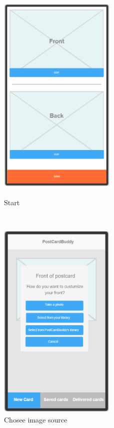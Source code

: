 \documentclass[10pt,a4paper]{article}
\begin{document}
\begin {description}
\begin{figure}[p]
\centering
	\begin{minipage}{0.5\textwidth}
	\centering
		\includegraphics[width=0.5\textwidth]{Prototype_img/p1.png}
		\caption{Start}
		\label{fig:p1}
	\end{minipage}~
	\begin{minipage}{0.5\textwidth}
	\centering
		\includegraphics[width=0.5\textwidth]{Prototype_img/p2.png}
		\caption{Chosee image source}
		\label{fig:p2}

\end{minipage}
\end{figure}
\end{description}
\end{document}
